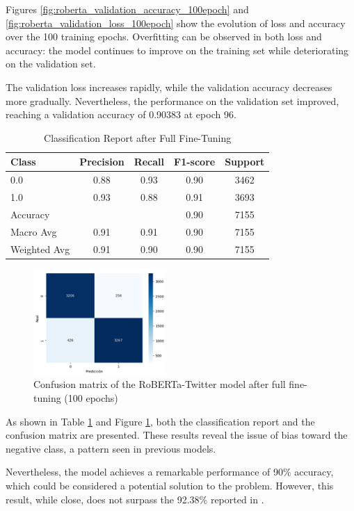 Figures \ref{fig:roberta_validation_accuracy_100epoch} and \ref{fig:roberta_validation_loss_100epoch} show the evolution of loss and accuracy over the 100 training epochs. Overfitting can be observed in both loss and accuracy: the model continues to improve on the training set while deteriorating on the validation set. 

The validation loss increases rapidly, while the validation accuracy decreases more gradually. Nevertheless, the performance on the validation set improved, reaching a validation accuracy of 0.90383 at epoch 96.

\begin{table}[H]
\centering
\caption{Classification Report after Full Fine-Tuning}
\label{tab:classification_report_final}
\begin{tabular}{lcccc}
\toprule
Class        & Precision & Recall & F1-score & Support \\
\midrule
0.0          & 0.88      & 0.93   & 0.90     & 3462    \\
1.0          & 0.93      & 0.88   & 0.91     & 3693    \\
\midrule
Accuracy     &           &        & 0.90     & 7155    \\
Macro Avg    & 0.91      & 0.91   & 0.90     & 7155    \\
Weighted Avg & 0.91      & 0.90   & 0.90     & 7155    \\
\bottomrule
\end{tabular}
\end{table}


\begin{figure}[H]
    \centering
    \includegraphics[width=0.45\textwidth]{images/robertaConfuctionMatriz100Epochs.png}
    \caption{Confusion matrix of the RoBERTa-Twitter model after full fine-tuning (100 epochs)}
    \label{fig:roberta_confusion_matrix_100epochs}
\end{figure}

As shown in Table \ref{tab:classification_report_final} and Figure \ref{fig:roberta_confusion_matrix_100epochs}, both the classification report and the confusion matrix are presented. These results reveal the issue of bias toward the negative class, a pattern seen in previous models. 

Nevertheless, the model achieves a remarkable performance of 90\% accuracy, which could be considered a potential solution to the problem. However, this result, while close, does not surpass the 92.38\% reported in \cite{fieri2023offensive}.
